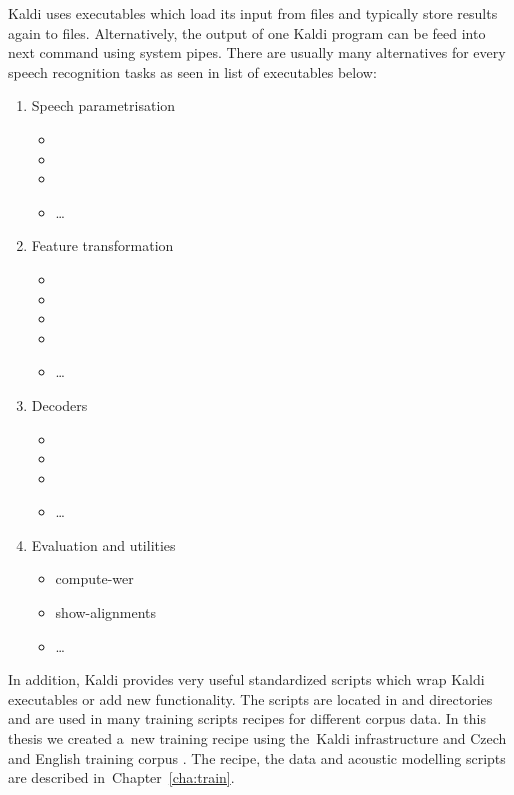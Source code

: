 Kaldi uses executables which load its input from files and typically store results again to files.
Alternatively, the output of one Kaldi program can be feed into next command using system pipes.
There are usually many alternatives for every speech recognition tasks as seen in list of executables below:
\begin{enumerate}
    \item Speech parametrisation
        \begin{itemize}
            \item {}
            \item {}
            \item {}
            \item \ldots
        \end{itemize}
    \item Feature transformation
        \begin{itemize}
            \item {}
            \item {}
            \item {}
            \item {}
            \item \ldots
        \end{itemize}
    \item Decoders
        \begin{itemize}
            \item {}
            \item {}
            \item {}
            \item \ldots
        \end{itemize}
    \item Evaluation and utilities
        \begin{itemize}
            \item compute-wer
            \item show-alignments
            \item \ldots
        \end{itemize}
\end{enumerate}
In addition, Kaldi provides very useful standardized scripts which wrap Kaldi executables or add new functionality. 
The scripts are located in  and  directories and are used in many training scripts recipes for different corpus data.
In this thesis we created a~new training recipe using the~Kaldi infrastructure and Czech and English training corpus \cite{korvas_2014}.
The recipe, the data and acoustic modelling scripts are described in~Chapter~\ref{cha:train}.

